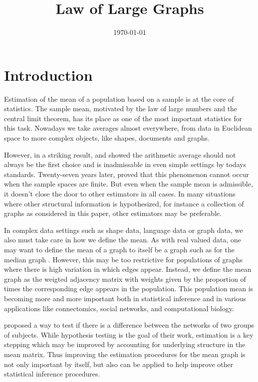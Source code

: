 \documentclass[a4paper]{article}
\title{Law of Large Graphs}
\date{\today}
\begin{document}
\maketitle

\section{Introduction}

Estimation of the mean of a population based on a sample is at the core of statistics.
The sample mean, motivated by the law of large numbers and the central limit theorem, has its place as one of the most important statistics for this task.
Nowadays we take averages almost everywhere, from data in Euclidean space to more complex objects, like shapes, documents and graphs.

However, in a striking result, \citet{stein1956inadmissibility} and \citet{james1961estimation} showed the arithmetic average should not always be the first choice and is inadmissable in even simple settings by todays standards. 
Twenty-seven years later, \citet{gutmann1982stein} proved that this phenomenon cannot occur when the sample spaces are finite.
But even when  the sample mean is admissible, it doesn't close the door to other estimators in all cases.
In many situations where other structural information is hypothesized, for instance a collection of graphs as considered in this paper, other estimators may be preferable.

In complex data settings such as shape data, language data or graph data, we also must take care in how we define the mean.
As with real valued data, one may want to define the mean of a graph to itself be a graph such as for the median graph \citep{jiang2001median}.
However, this may be too restrictive for populations of graphs where there is high variation in which edges appear. 
Instead, we define the mean graph as the weigted adjacency matrix with weights given by the proportion of times the corresponding edge appears in the population. 
This population mean is becoming more and more important both in statistical inference and in various applications like connectomics, social networks, and computational biology.


\citet{ginestet2014hypothesis} proposed a way to test if there is a difference between the networks of two groups of subjects. 
While hypothesis testing is the goal of their work, estimation is a key stepping which may be improved by accounting for underlying structure in the mean matrix. 
Thus improving the estimation procedures for the mean graph is not only important by itself, but also can be applied to help improve other statistical inference procedures.
\end{document}
